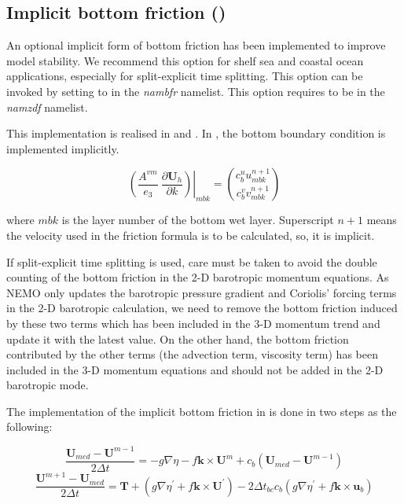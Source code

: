 \documentclass[../main/NEMO_manual]{subfiles}
\begin{document}
\subsection{Implicit bottom friction (\protect{})}
\label{subsec:ZDF_bfr_imp}

An optional implicit form of bottom friction has been implemented to improve model stability.
We recommend this option for shelf sea and coastal ocean applications, especially for split-explicit time splitting.
This option can be invoked by setting  to  in the \textit{nambfr} namelist.
This option requires  to be  in the \textit{namzdf} namelist. 

This implementation is realised in  and . In ,
the bottom boundary condition is implemented implicitly.

\[
  \left.{\left( {\frac{A^{vm} }{e_3 }\ \frac{\partial \textbf{U}_h}{\partial k}} \right)} \right|_{mbk}
  = \binom{c_{b}^{u}u^{n+1}_{mbk}}{c_{b}^{v}v^{n+1}_{mbk}}
\]

where $mbk$ is the layer number of the bottom wet layer.
Superscript $n+1$ means the velocity used in the friction formula is to be calculated, so, it is implicit.

If split-explicit time splitting is used, care must be taken to avoid the double counting of the bottom friction in
the 2-D barotropic momentum equations.
As NEMO only updates the barotropic pressure gradient and Coriolis' forcing terms in the 2-D barotropic calculation,
we need to remove the bottom friction induced by these two terms which has been included in the 3-D momentum trend 
and update it with the latest value.
On the other hand, the bottom friction contributed by the other terms
(\eg the advection term, viscosity term) has been included in the 3-D momentum equations and
should not be added in the 2-D barotropic mode.

The implementation of the implicit bottom friction in  is done in two steps as the following:

\[
  \frac{\textbf{U}_{med}-\textbf{U}^{m-1}}{2\Delta t}=-g\nabla\eta-f\textbf{k}\times\textbf{U}^{m}+c_{b}
  \left(\textbf{U}_{med}-\textbf{U}^{m-1}\right)
\]
\[
  \frac{\textbf{U}^{m+1}-\textbf{U}_{med}}{2\Delta t}=\textbf{T}+
  \left(g\nabla\eta^{'}+f\textbf{k}\times\textbf{U}^{'}\right)-
  2\Delta t_{bc}c_{b}\left(g\nabla\eta^{'}+f\textbf{k}\times\textbf{u}_{b}\right)
\]
\end{document}
